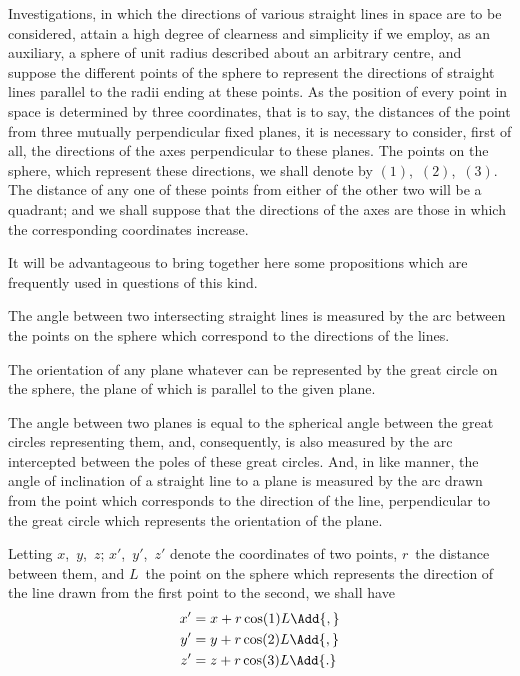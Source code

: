Investigations, in which the directions of various straight lines in space are to be
considered, attain a high degree of clearness and simplicity if we employ, as an auxiliary,
a sphere of unit radius described about an arbitrary centre, and suppose the
different points of the sphere to represent the directions of straight lines parallel to
the radii ending at these points. As the position of every point in space is determined
by three coordinates, that is to say, the distances of the point from three mutually
perpendicular fixed planes, it is necessary to consider, first of all, the directions of the
axes perpendicular to these planes. The points on the sphere, which represent these
directions, we shall denote by $(1)$,~$(2)$,~$(3)$. The distance of any one of these points
from either of the other two will be a quadrant; and we shall suppose that the directions
of the axes are those in which the corresponding coordinates increase.


It will be advantageous to bring together here some propositions which are frequently
used in questions of this kind.

 The angle between two intersecting straight lines is measured by the arc
between the points on the sphere which correspond to the directions of the lines.

 The orientation of any plane whatever can be represented by the great circle
on the sphere, the plane of which is parallel to the given plane.

 The angle between two planes is equal to the spherical angle between the
great circles representing them, and, consequently, is also measured by the arc intercepted
between the poles of these great circles. And, in like manner, the angle of inclination
of a straight line to a plane is measured by the arc drawn from the point which
corresponds to the direction of the line, perpendicular to the great circle which represents
the orientation of the plane.

 Letting $x$,~$y$,~$z$; $x'$,~$y'$,~$z'$ denote the coordinates of two points, $r$~the distance
between them, and $L$~the point on the sphere which represents the direction of the line
drawn from the first point to the second, we shall have
\begin{align*}
x' &= x + r \cos(1)L\Add{,} \\
y' &= y + r \cos(2)L\Add{,} \\
z' &= z + r \cos(3)L\Add{.}
\end{align*}

